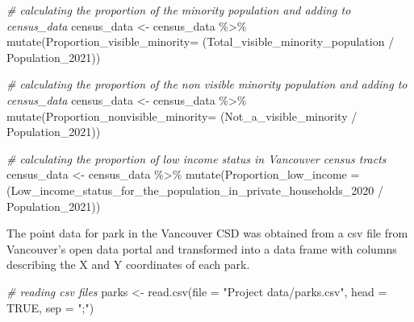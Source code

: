 \documentclass[
]{article}
\newenvironment{Shaded}{\begin{snugshade}}{\end{snugshade}}
\newcommand{\AttributeTok}[1]{\textcolor[rgb]{0.77,0.63,0.00}{#1}}
\newcommand{\CommentTok}[1]{\textcolor[rgb]{0.56,0.35,0.01}{\textit{#1}}}
\newcommand{\ConstantTok}[1]{\textcolor[rgb]{0.00,0.00,0.00}{#1}}
\newcommand{\FunctionTok}[1]{\textcolor[rgb]{0.00,0.00,0.00}{#1}}
\newcommand{\NormalTok}[1]{#1}
\newcommand{\OtherTok}[1]{\textcolor[rgb]{0.56,0.35,0.01}{#1}}
\newcommand{\SpecialCharTok}[1]{\textcolor[rgb]{0.00,0.00,0.00}{#1}}
\newcommand{\StringTok}[1]{\textcolor[rgb]{0.31,0.60,0.02}{#1}}
\begin{document}
\begin{Shaded}
\begin{Highlighting}[]
\CommentTok{\# calculating the proportion of the minority population and adding to census\_data}
\NormalTok{census\_data }\OtherTok{\textless{}{-}}\NormalTok{ census\_data }\SpecialCharTok{\%\textgreater{}\%}
  \FunctionTok{mutate}\NormalTok{(}\AttributeTok{Proportion\_visible\_minority=}\NormalTok{ (Total\_visible\_minority\_population }\SpecialCharTok{/}\NormalTok{ Population\_2021))}
\end{Highlighting}
\end{Shaded}

\begin{Shaded}
\begin{Highlighting}[]
\CommentTok{\# calculating the proportion of the non visible minority population and adding to census\_data}
\NormalTok{census\_data }\OtherTok{\textless{}{-}}\NormalTok{ census\_data }\SpecialCharTok{\%\textgreater{}\%}
  \FunctionTok{mutate}\NormalTok{(}\AttributeTok{Proportion\_nonvisible\_minority=}\NormalTok{ (Not\_a\_visible\_minority }\SpecialCharTok{/}\NormalTok{ Population\_2021))}
\end{Highlighting}
\end{Shaded}

\begin{Shaded}
\begin{Highlighting}[]
\CommentTok{\# calculating the proportion of low income status in Vancouver census tracts}
\NormalTok{census\_data }\OtherTok{\textless{}{-}}\NormalTok{ census\_data }\SpecialCharTok{\%\textgreater{}\%}
  \FunctionTok{mutate}\NormalTok{(}\AttributeTok{Proportion\_low\_income =}\NormalTok{ (Low\_income\_status\_for\_the\_population\_in\_private\_households\_2020 }\SpecialCharTok{/}\NormalTok{ Population\_2021))}
\end{Highlighting}
\end{Shaded}

The point data for park in the Vancouver CSD was obtained from a csv
file from Vancouver's open data portal and transformed into a data frame
with columns describing the X and Y coordinates of each park.

\begin{Shaded}
\begin{Highlighting}[]
\CommentTok{\# reading csv files}
\NormalTok{parks }\OtherTok{\textless{}{-}} \FunctionTok{read.csv}\NormalTok{(}\AttributeTok{file =} \StringTok{"Project data/parks.csv"}\NormalTok{, }\AttributeTok{head =} \ConstantTok{TRUE}\NormalTok{, }\AttributeTok{sep =} \StringTok{";"}\NormalTok{) }
\end{Highlighting}
\end{Shaded}
\end{document}
